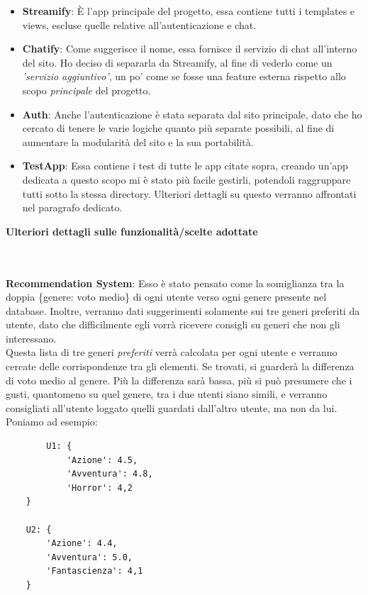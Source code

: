 \documentclass[12pt]{article}
\begin{document}
	\begin{itemize}
		\item \textbf{Streamify}: È l'app principale del progetto, essa contiene tutti i templates e views, escluse quelle relative all'autenticazione e chat. 
		
		\item \textbf{Chatify}: Come suggerisce il nome, essa fornisce il servizio di chat all'interno del sito. Ho deciso di separarla da Streamify, al fine di vederlo come un \textit{'servizio aggiuntivo'}, un po' come se fosse una feature esterna rispetto allo scopo \textit{principale} del progetto.
		
		\item \textbf{Auth}: Anche l'autenticazione è stata separata dal sito principale, dato che ho cercato di tenere le varie logiche quanto più separate possibili, al fine di aumentare la modularità del sito e la sua portabilità.
		
		\item \textbf{TestApp}: Essa contiene i test di tutte le app citate sopra, creando un'app dedicata a questo scopo mi è stato più facile gestirli, potendoli raggruppare tutti sotto la stessa directory. Ulteriori dettagli su questo verranno affrontati nel paragrafo dedicato. \\
	\end{itemize}
	\pagebreak
	
	
	\noindent \centerline {\Huge \textbf{Ulteriori dettagli sulle funzionalità/scelte adottate}} \\ \\
	
	\noindent \textbf{Recommendation System}: Esso è stato pensato come la somiglianza tra la doppia \{genere: voto medio\} di ogni utente verso ogni genere presente nel database.
	Inoltre, verranno dati suggerimenti solamente sui tre generi preferiti da utente, dato che difficilmente egli vorrà ricevere consigli su generi che non gli interessano. \\Questa lista di tre generi \textit{preferiti} verrà calcolata per ogni utente e verranno cercate delle corrispondenze tra gli elementi. Se trovati, si guarderà la differenza di voto medio al genere. Più la differenza sarà bassa, più si può presumere che i gusti, quantomeno su quel genere, tra i due utenti siano simili, e verranno consigliati all'utente loggato quelli guardati dall'altro utente, ma non da lui. \\
	Poniamo ad esempio:
	\begin{verbatim}
		U1: {
			'Azione': 4.5,
			'Avventura': 4.8,
			'Horror': 4,2
	}

	U2: {
		'Azione': 4.4,
		'Avventura': 5.0,
		'Fantascienza': 4,1
	}
	\end{verbatim}
\end{document}
